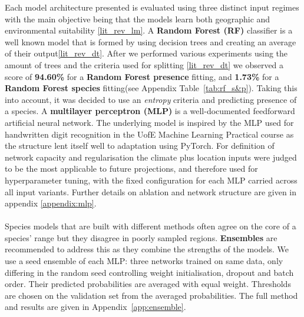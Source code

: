\documentclass{article}
\begin{document}
Each model architecture presented is evaluated using three distinct input regimes with the main objective being that the models learn both geographic and environmental suitability \ref{lit_rev_lm}.
A \textbf{Random Forest (RF)} classifier is a well known model that is formed by using decision trees and creating an average of their output\ref{lit_rev_dt}.
After we performed various experiments using the amount of trees and the criteria used for splitting \ref{lit_rev_dt} we observed a score of \textbf{94.60\%} for a \textbf{Random Forest presence} fitting, and \textbf{1.73\%} for a \textbf{Random Forest species} fitting(see Appendix Table~\ref{tab:rf_s&p}).
Taking this into account, it was decided to use an \textit{entropy} criteria and predicting presence of a species.
A \textbf{multilayer perceptron (MLP)} is a well-documented feedforward artificial neural network. The underlying model is inspired by the MLP used for handwritten digit recognition in the UofE Machine Learning Practical course \cite{machine_learning_practical} as the structure lent itself well to adaptation using PyTorch\cite{paszke2019pytorch}. 
For definition of network capacity and regularisation the climate plus location inputs were judged to be the most applicable to future projections, and therefore used for hyperparameter tuning, with the fixed configuration for each MLP carried across all input variants. Further details on ablation and network structure are given in appendix \ref{appendix:mlp}.
\\\\
 Species models that are built with different methods often agree on the core of a species' range but they disagree in poorly sampled regions. \textbf{Ensembles} are recommended to address this \cite{SERRA2026103563} as they combine the strengths of the models. We use a seed ensemble of each MLP: three networks trained on same data, only differing in the random seed controlling weight initialisation, dropout and batch order. Their predicted probabilities are averaged with equal weight. Thresholds are chosen on the validation set from the averaged probabilities. The full method and results are given in Appendix~\ref{app:ensemble}.
\end{document}
